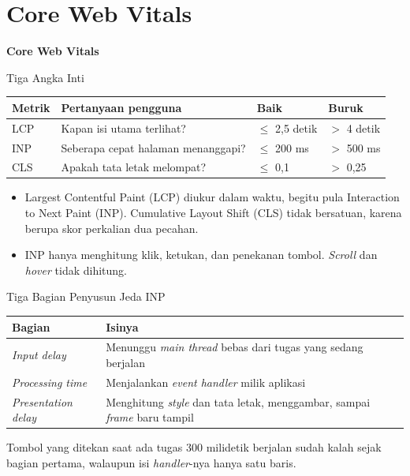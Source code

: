 \documentclass[aspectratio=169, table, 12pt]{beamer}
\begin{document}
\section{Core Web Vitals}

\begin{frame}{\hfill}
  \centering
  \Huge{\textbf{Core Web Vitals}}
\end{frame}

\begin{frame}{{\Large Tiga Angka Inti}}
  \vspace{5pt}
  \centering
  {\small
  \begin{tabularx}{0.95\textwidth}{lXll}
    \hline
    \textbf{Metrik} & \textbf{Pertanyaan pengguna} & \textbf{Baik} & \textbf{Buruk} \\
    \hline
    LCP & Kapan isi utama terlihat?          & $\leq$ 2,5 detik & $>$ 4 detik \\
    \hline
    INP & Seberapa cepat halaman menanggapi? & $\leq$ 200 ms    & $>$ 500 ms \\
    \hline
    CLS & Apakah tata letak melompat?        & $\leq$ 0,1       & $>$ 0,25 \\
    \hline
  \end{tabularx}}

  \vspace{10pt}
  \begin{itemize}
    \item Largest Contentful Paint (LCP) diukur dalam waktu, begitu pula Interaction to Next Paint (INP). Cumulative Layout Shift (CLS) tidak bersatuan,
          karena berupa skor perkalian dua pecahan.
    \item INP hanya menghitung klik, ketukan, dan penekanan tombol.
          \textit{Scroll} dan \textit{hover} tidak dihitung.
  \end{itemize}
\end{frame}

\begin{frame}{{\Large Tiga Bagian Penyusun Jeda INP}}
  \vspace{5pt}
  \centering
  {\small
  \begin{tabularx}{0.95\textwidth}{lX}
    \hline
    \textbf{Bagian} & \textbf{Isinya} \\
    \hline
    \textit{Input delay} & Menunggu \textit{main thread} bebas dari tugas yang sedang berjalan \\
    \hline
    \textit{Processing time} & Menjalankan \textit{event handler} milik aplikasi \\
    \hline
    \textit{Presentation delay} & Menghitung \textit{style} dan tata letak, menggambar, sampai \textit{frame} baru tampil \\
    \hline
  \end{tabularx}}

  \vspace{8pt}
  {\footnotesize Tombol yang ditekan saat ada tugas 300 milidetik berjalan
  sudah kalah sejak bagian pertama, walaupun isi \textit{handler}-nya hanya
  satu baris.}
\end{frame}
\end{document}
